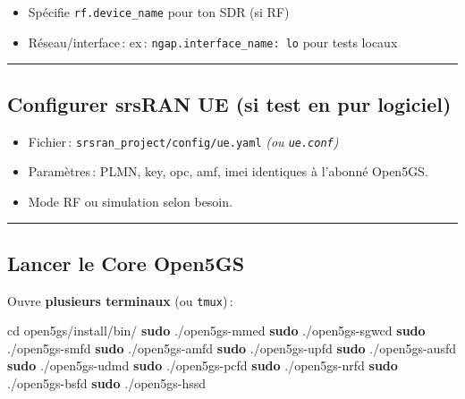 \documentclass[
]{article}
\newenvironment{Shaded}{\begin{snugshade}}{\end{snugshade}}
\newcommand{\BuiltInTok}[1]{#1}
\newcommand{\FunctionTok}[1]{\textcolor[rgb]{0.13,0.29,0.53}{\textbf{#1}}}
\newcommand{\NormalTok}[1]{#1}
\providecommand{\tightlist}{%
  \setlength{\itemsep}{0pt}\setlength{\parskip}{0pt}}
\begin{document}
\begin{itemize}
\tightlist
\item
  Spécifie \texttt{rf.device\_name} pour ton SDR (si RF)
\item
  Réseau/interface\,: ex\,: \texttt{ngap.interface\_name:\ lo} pour
  tests locaux
\end{itemize}

\begin{center}\rule{0.5\linewidth}{0.5pt}\end{center}

\subsection{Configurer srsRAN UE (si test en pur
logiciel)}\label{configurer-srsran-ue-si-test-en-pur-logiciel}

\begin{itemize}
\tightlist
\item
  Fichier\,: \texttt{srsran\_project/config/ue.yaml} \emph{(ou
  \texttt{ue.conf})}
\item
  Paramètres\,: PLMN, key, opc, amf, imei identiques à l'abonné Open5GS.
\item
  Mode RF ou simulation selon besoin.
\end{itemize}

\begin{center}\rule{0.5\linewidth}{0.5pt}\end{center}

\subsection{Lancer le Core Open5GS}\label{lancer-le-core-open5gs}

Ouvre \textbf{plusieurs terminaux} (ou \texttt{tmux})\,:

\begin{Shaded}
\begin{Highlighting}[]
\BuiltInTok{cd}\NormalTok{ open5gs/install/bin/}
\FunctionTok{sudo}\NormalTok{ ./open5gs{-}mmed}
\FunctionTok{sudo}\NormalTok{ ./open5gs{-}sgwcd}
\FunctionTok{sudo}\NormalTok{ ./open5gs{-}smfd}
\FunctionTok{sudo}\NormalTok{ ./open5gs{-}amfd}
\FunctionTok{sudo}\NormalTok{ ./open5gs{-}upfd}
\FunctionTok{sudo}\NormalTok{ ./open5gs{-}ausfd}
\FunctionTok{sudo}\NormalTok{ ./open5gs{-}udmd}
\FunctionTok{sudo}\NormalTok{ ./open5gs{-}pcfd}
\FunctionTok{sudo}\NormalTok{ ./open5gs{-}nrfd}
\FunctionTok{sudo}\NormalTok{ ./open5gs{-}bsfd}
\FunctionTok{sudo}\NormalTok{ ./open5gs{-}hssd}
\end{Highlighting}
\end{Shaded}
\end{document}
